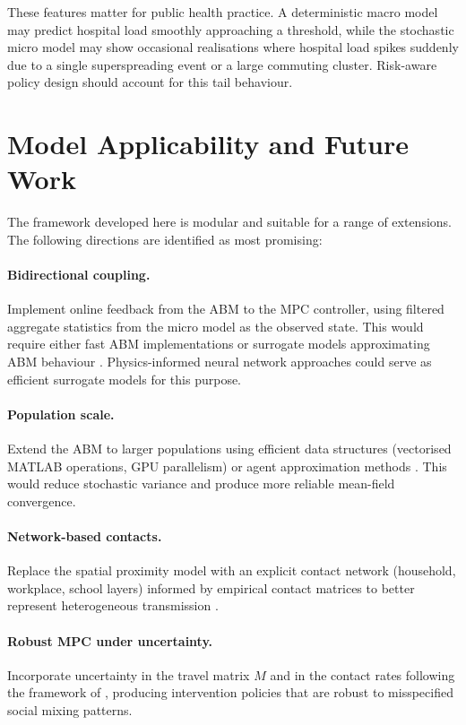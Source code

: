 These features matter for public health practice.
A deterministic macro model may predict hospital load smoothly approaching a threshold, while the stochastic micro model may show occasional realisations where hospital load spikes suddenly due to a single superspreading event or a large commuting cluster.
Risk-aware policy design should account for this tail behaviour.

\section{Model Applicability and Future Work}
\label{sec:future}

The framework developed here is modular and suitable for a range of extensions.
The following directions are identified as most promising:

\paragraph{Bidirectional coupling.}
Implement online feedback from the ABM to the MPC controller, using filtered aggregate statistics from the micro model as the observed state.
This would require either fast ABM implementations or surrogate models approximating ABM behaviour \citep{grune2017,polcz2025}.
Physics-informed neural network approaches \citep{zhong2025} could serve as efficient surrogate models for this purpose.

\paragraph{Population scale.}
Extend the ABM to larger populations using efficient data structures (vectorised MATLAB operations, GPU parallelism) or agent approximation methods \citep{kerr2021}.
This would reduce stochastic variance and produce more reliable mean-field convergence.

\paragraph{Network-based contacts.}
Replace the spatial proximity model with an explicit contact network (household, workplace, school layers) informed by empirical contact matrices \citep{zhang2021} to better represent heterogeneous transmission \citep{grundel2022}.

\paragraph{Robust MPC under uncertainty.}
Incorporate uncertainty in the travel matrix $M$ and in the contact rates following the framework of \citet{albi2021}, producing intervention policies that are robust to misspecified social mixing patterns.

